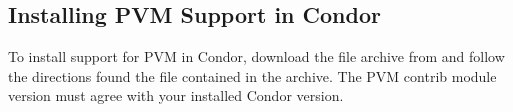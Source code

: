 \subsection{\label{sec:Install-PVM-Condor}
Installing PVM Support in Condor} 

To install support for PVM in Condor, download the file archive from
 and follow the directions
found the  file contained in the archive.
\Note The PVM contrib module version must agree with your installed
Condor version.
